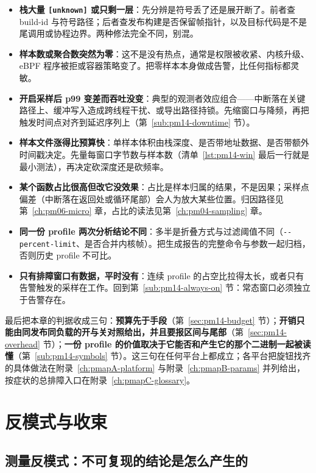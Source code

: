 \documentclass[12pt,a4paper,fontset=fandol]{ctexbook}
\newcommand{\Tp}[1]{\texttt{#1}}
\newcommand{\Opt}[1]{\texttt{-\/-#1}}
\newcommand{\Mx}[1]{\textsf{#1}}
\begin{document}
\begin{itemize}
  \item \textbf{栈大量 \Tp{[unknown]} 或只剩一层}：先分辨是符号丢了还是展开断了。前者查 build-id 与符号路径；后者查发布构建是否保留帧指针，以及目标代码是不是尾调用或协程边界。两种修法完全不同，别混。
  \item \textbf{样本数或聚合数突然为零}：这不是没有热点，通常是权限被收紧、内核升级、eBPF 程序被拒或容器策略变了。把零样本本身做成告警，比任何指标都灵敏。
  \item \textbf{开启采样后 \Mx{p99} 变差而吞吐没变}：典型的观测者效应组合——中断落在关键路径上、缓冲写入造成跨线程干扰、或导出路径持锁。先缩窗口与降频，再把触发时间点对齐到延迟序列上（第~\ref{sub:pm14-downtime} 节）。
  \item \textbf{样本文件涨得比预算快}：单样本体积由栈深度、是否带地址数据、是否带额外时间戳决定。先量每窗口字节数与样本数（清单~\ref{lst:pm14-win} 最后一行就是最小测法），再决定砍深度还是砍频率。
  \item \textbf{某个函数占比很高但改它没效果}：占比是样本归属的结果，不是因果；采样点偏差（中断落在返回处或循环尾部）会人为放大某些位置。归因路径见第~\ref{ch:pm06-micro} 章，占比的读法见第~\ref{ch:pm04-sampling} 章。
  \item \textbf{同一份 profile 两次分析结论不同}：多半是折叠方式与过滤阈值不同（\Opt{percent-limit}、是否合并内核帧）。把生成报告的完整命令与参数一起归档，否则历史 profile 不可比。
  \item \textbf{只有排障窗口有数据，平时没有}：连续 profile 的占空比拉得太长，或者只有告警触发的采样在工作。回到第~\ref{sub:pm14-always-on} 节：常态窗口必须独立于告警存在。
\end{itemize}

最后把本章的判据收成三句：\textbf{预算先于手段}（第~\ref{sec:pm14-budget} 节）；\textbf{开销只能由同发布同负载的开与关对照给出，并且要报区间与尾部}（第~\ref{sec:pm14-overhead} 节）；\textbf{一份 profile 的价值取决于它能否和产生它的那个二进制一起被读懂}（第~\ref{sub:pm14-symbols} 节）。这三句在任何平台上都成立；各平台把旋钮找齐的具体做法在附录~\ref{ch:pmapA-platform} 与附录~\ref{ch:pmapB-params} 并列给出，按症状的总排障入口在附录~\ref{ch:pmapC-glossary}。

\part{反模式与收束}

\chapter{测量反模式：不可复现的结论是怎么产生的}
\label{ch:pm15-antipattern}
\end{document}
